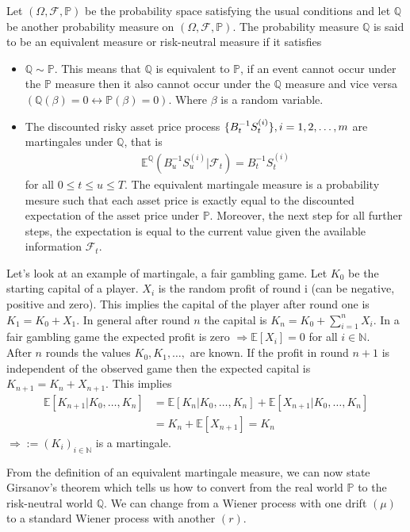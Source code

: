 Let $(\Omega, \mathcal{F}, \mathbb{P})$ be the probability space
satisfying the usual conditions and let $\mathbb{Q}$ be another probability measure on $(\Omega, \mathcal{F}, \mathbb{P})$. The
probability measure $\mathbb{Q}$ is said to be an equivalent measure or risk-neutral measure if it satisfies
\begin{itemize}
	\item $\mathbb{Q} \sim \mathbb{P}$. This means that $\mathbb{Q}$ is equivalent to $\mathbb{P}$, if an
	event cannot occur under the $\mathbb{P}$ measure then it also cannot occur under the $\mathbb{Q}$ measure and
	vice versa $(\mathbb{Q}(\beta)=0\leftrightarrow \mathbb{P}(\beta)=0)$. Where $\beta$ is a random variable.  
	\item The discounted  risky asset price process $\{B_t^{-1}S_t^{(i)}\}, i=1,2,\mathellipsis, m $ are martingales under $\mathbb{Q}$, that is
	\begin{align*}
	\mathbb{E}^{\mathbb{Q}}(B_u^{-1}S_u^{(i)}| \mathcal{F}_t)=B_t^{-1}S_t^{(i)}
	\end{align*}
	for all $0 \leq t \leq u \leq T$. The equivalent martingale measure is a probability mesure such that each asset price is exactly equal to the discounted expectation of the asset price under $\mathbb{P}$. Moreover, the next step for all further steps, the expectation is equal to the current value given the available information $\mathcal{F}_t$. 
\end{itemize}
Let's look at an example of martingale, a fair gambling game. Let $K_0$ be the starting capital of a player. $X_i$ is the random profit of round i (can be negative, positive and zero). This implies the capital of the player after round one is $K_1=K_0+X_1$. In general after round $n$ the capital is $K_n=K_0+\sum_{i=1}^{n}X_i$. In a fair gambling game the expected profit is zero $\Rightarrow \mathbb{E}[X_i]=0$ for all $i\in \mathbb{N}$.\\
After $n$ rounds the values $K_0, K_1, \dots ,$ are known. If the profit in round $n+1$ is independent of the observed game then the expected capital is $K_{n+1}=K_n+X_{n+1}$. This implies
\begin{align*}
	\mathbb{E}[K_{n+1}|K_0,\dots,K_n]&=\mathbb{E}[K_{n}|K_0,\dots,K_n]+\mathbb{E}[X_{n+1}|K_0,\dots,K_n]\\
	&=K_n+\mathbb{E}[X_{n+1}]=K_n
\end{align*}
$\Rightarrow := (K_i)_{i\in \mathbb{N}}$ is a martingale. 
 
From the definition of an equivalent martingale measure, we can now state Girsanov’s theorem
which tells us how to convert from the real world $\mathbb{P}$ to the risk-neutral world $\mathbb{Q}$. We can change from a Wiener process with one drift $(\mu)$ to a standard Wiener process with another $(r)$.


